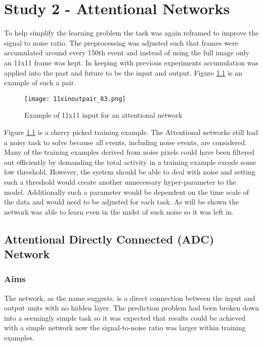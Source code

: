 \chapter{Study 2 - Attentional Networks}
\label{ch:attentional}
To help simplify the learning problem the task was again reframed to improve the signal to noise ratio.
The preprocessing was adjusted such that frames were accumulated around every 150th event and instead of using the full image only an 11x11 frame was kept.
In keeping with previous experiments accumulation was applied into the past and future to be the input and output. 
Figure \ref{fig:11inoutpair} is an example of such a pair.

\begin{figure}[h]
    \centering
    \texttt{[image: 11xinoutpair\_83.png]}
    \caption{Example of 11x11 input for an attentional network}
    \label{fig:11inoutpair}
\end{figure}

Figure \ref{fig:11inoutpair} is a cherry picked training example.
The Attentional networks still had a noisy task to solve because all events, including noise events, are considered. 
Many of the training examples derived from noise pixels could have been filtered out efficiently by demanding the total activity in a training example excede some low threshold.
However, the system should be able to deal with noise and setting such a threshold would create another unnecessary hyper-parameter to the model.
Additionally such a parameter would be dependent on the time scale of the data and would need to be adjusted for each task. 
As will be shown the network was able to learn even in the midst of such noise so it was left in. 

\section{Attentional Directly Connected (ADC) Network}

\subsection{Aims}
The network, as the name suggests, is a direct connection between the input and output units with no hidden layer.
The prediction problem had been broken down into a seemingly simple task so it was expected that results could be achieved with a simple network now the signal-to-noise ratio was larger within training examples.


